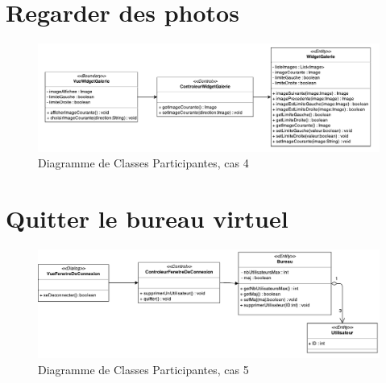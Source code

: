 \section{Regarder des photos}
\begin{figure}[H]
	\centering
	\includegraphics[angle=90]{diagrammes/DCP4.pdf}
	\caption{Diagramme de Classes Participantes, cas 4}
\end{figure}

\section{Quitter le bureau virtuel}

\begin{figure}[H]
	\centering
	\includegraphics[angle=90]{diagrammes/DCP5.pdf}
	\caption{Diagramme de Classes Participantes, cas 5}
\end{figure}